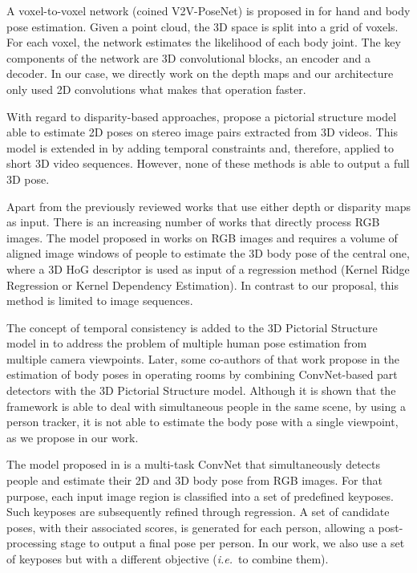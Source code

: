 \documentclass[review,12pt,3p]{elsarticle}
\def \ie{\textit{i.e.}}
\begin{document}
%
A voxel-to-voxel network (coined V2V-PoseNet) is proposed in \cite{moon2018cvpr} for hand and body pose estimation. Given a point cloud, the 3D space is split into a grid of voxels. For each voxel, the network estimates the likelihood of each body joint. The key components of the network are 3D convolutional blocks, an encoder and a decoder. In our case, we directly work on the depth maps and our architecture only used 2D convolutions what makes that operation faster.

With regard to disparity-based approaches, \citep{LopezQuintero2016} propose a pictorial structure model able to estimate 2D poses on stereo image pairs extracted from 3D videos. This model is extended in \citep{LopezQuintero2017} by adding temporal constraints and, therefore, applied to short 3D video sequences. However, none of these methods is able to output a full 3D pose.

Apart from the previously reviewed works that use either depth or disparity maps as input. There is an increasing number of works that directly process RGB images.
%
The model proposed in \cite{tekin2015arxiv} works on RGB images and requires a volume of aligned image windows of people to estimate the 3D body pose of the central one, where a 3D HoG descriptor is used as input of a regression method (Kernel Ridge Regression or Kernel Dependency Estimation). In contrast to our proposal, this method is limited to image sequences.


The concept of temporal consistency is added to the 3D Pictorial Structure model in \cite{belagiannis2014weccv} to address the problem of
multiple human pose estimation from multiple camera viewpoints. Later, some co-authors of that work propose in \cite{belagiannis2016mva} the estimation of body poses in operating rooms by combining ConvNet-based part detectors with the 3D Pictorial Structure model.
Although it is shown that the framework is able to deal with simultaneous people in the same scene, by using a person tracker, it is not able to estimate the body pose with a single viewpoint, as we propose in our work.

The model proposed in \cite{rogez2017lcr} is a multi-task ConvNet that simultaneously detects people and estimate their 2D and 3D body pose from RGB images. For that purpose, each input image region is classified into a set of predefined keyposes. Such keyposes are subsequently refined through regression. A set of candidate poses, with their associated scores, is generated for each person, allowing a post-processing stage to output a final pose per person. 
In our work, we also use a set of keyposes but with a different objective (\ie~to combine them).
\end{document}
